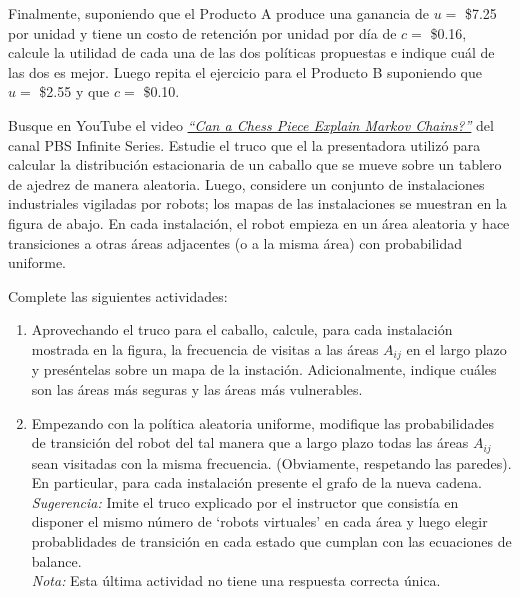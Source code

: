 \documentclass[ a4paper, twoside, 11pt]{article}
\begin{document}
\begin{problem}
\begin{enumerate}[label=\textbf{\alph*)}]
Finalmente, suponiendo que el Producto A produce una ganancia de $u =$ \$7.25 por unidad y tiene un costo de retenci\'on por unidad por d\'ia de $c =$ \$0.16, calcule la utilidad de cada una de las dos pol\'iticas propuestas e indique cu\'al de las dos es mejor. Luego repita el ejercicio para el Producto B suponiendo que $u =$ \$2.55 y que $c =$ \$0.10. 

\end{enumerate}
\QED

\end{problem}
\fullskip

\begin{problem}
Busque en YouTube el video \href{https://www.youtube.com/watch?v=63HHmjlh794&list=PLhfK9LVRQ8ywzGXyQDIvH4_XBIcrPp89r}{\emph{``Can a Chess Piece Explain Markov Chains?''}} del canal PBS Infinite Series. Estudie el truco que el la presentadora utiliz\'o para calcular la distribuci\'on estacionaria de un caballo que se mueve sobre un tablero de ajedrez de manera aleatoria. Luego, considere un conjunto de instalaciones industriales vigiladas por robots; los mapas de las instalaciones se muestran en la figura de abajo. En cada instalaci\'on, el robot empieza en un \'area aleatoria y hace transiciones a otras \'areas adjacentes (o a la misma \'area) con probabilidad uniforme. 

\begin{figure}[htb]
\centering
\def\svgwidth{0.98\columnwidth}

\end{figure}
\halfskip

Complete las siguientes actividades: 
\begin{enumerate}[label=\textbf{\alph*)}]
\item Aprovechando el truco para el caballo, calcule, para cada instalaci\'on mostrada en la figura, la frecuencia de visitas a las \'areas $A_{ij}$ en el largo plazo y pres\'entelas sobre un mapa de la instaci\'on. Adicionalmente, indique cu\'ales son las \'areas m\'as seguras y las \'areas m\'as vulnerables. 
\item Empezando con la pol\'itica aleatoria uniforme, modifique las probabilidades de transici\'on del robot del tal manera que a largo plazo todas las \'areas $A_{ij}$ sean visitadas con la misma frecuencia. (Obviamente, respetando las paredes). En particular, para cada instalaci\'on presente el grafo de la nueva cadena. \\ \emph{Sugerencia:} Imite el truco explicado por el instructor que consist\'ia en disponer el mismo n\'umero de `robots virtuales' en cada \'area y luego elegir probablidades de transici\'on en cada estado que cumplan con las ecuaciones de balance. \\
\emph{Nota:} Esta \'ultima actividad no tiene una respuesta correcta \'unica. 
\end{enumerate}

\end{problem}
\fullskip
\end{document}
